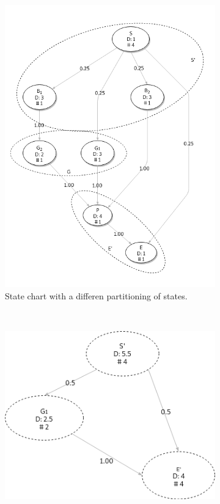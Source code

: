 \documentclass[12pt]{extarticle}
\begin{document}
\begin{figure}[H]
    \centering
    \begin{subfigure}[b]{0.6\textwidth}
        \includegraphics[width=\textwidth]{Diagrams/Statecharts/statemachine_preview2.png}
        \caption{State chart with a differen partitioning of states.}
        \label{fig:preview2}
    \end{subfigure}
    \\ %
    \begin{subfigure}[b]{0.45\textwidth}
        \includegraphics[width=\textwidth]{Diagrams/Statecharts/statemachine_view2.png}

\end{subfigure}
\end{figure}
\end{document}
